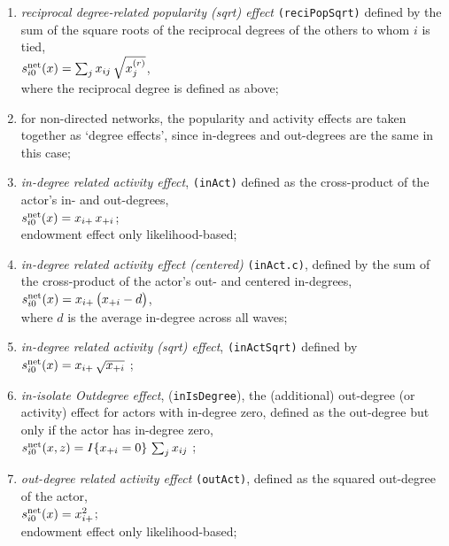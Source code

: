 \documentclass[a4paper,fleqn,11pt]{article}
\newcommand{\+}{\, + \,}
\newcommand{\vit}{\theenumi}
\begin{document}
\begin{enumerate}
 \item {\em reciprocal degree-related popularity (sqrt) effect } \texttt{(reciPopSqrt)}
 defined by the sum of the square roots of the reciprocal degrees
 of the others to whom $i$ is tied,\\
 $s^{\rm net}_{i\vit}(x) =  \sum_j x_{ij}\, \sqrt{x^{(r)}_{j}} $, \\
 where the reciprocal degree is defined as above;

 \item[{\hspace*{-1ex}$\bigodot$}] for non-directed networks, the popularity and activity
 effects are taken together as `degree effects',
 since in-degrees and out-degrees are the same in this case;

 \item {\em in-degree related activity effect}, \texttt{(inAct)}
 defined as  the cross-product  of the actor's in- and out-degrees,\\
 $s^{\rm net}_{i\vit}(x) = x_{i+}\, x_{+i}$;\\
 endowment effect only likelihood-based;

 \item {\em in-degree related activity effect (centered)} \texttt{(inAct.c)},
 defined by the sum of
 the cross-product of the actor's out- and centered in-degrees,\\
 $s^{\rm net}_{i\vit}(x) =  x_{i+}\,\big( x_{+i} - d \big)$,\\
 where $d$ is the average in-degree across all waves;

 \item {\em in-degree related activity (sqrt) effect}, \texttt{(inActSqrt)}
 defined by  \\
 $s^{\rm net}_{i\vit}(x) = x_{i+}\,\sqrt{x_{+i}}$ ;

\item \emph{in-isolate Outdegree effect}, (\texttt{inIsDegree}), the
      (additional) out-degree (or activity)
      effect for actors with in-degree zero, defined as the out-degree
      but only if the actor has in-degree zero,\\
 $s^{\rm net}_{i\vit}(x, z) =   I\{x_{+i} = 0 \}\, \sum_j x_{ij}   $ ;\\

 \item {\em out-degree related activity effect} \texttt{(outAct)},
 	 defined as the squared out-degree of the actor,\\
 $s^{\rm net}_{i\vit}(x) = x^2_{i+}$;\\
 endowment effect only likelihood-based;



\end{enumerate}
\end{document}
